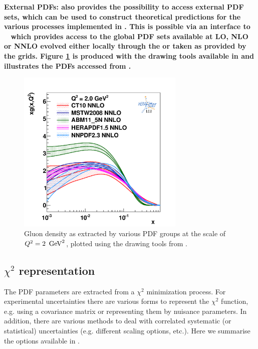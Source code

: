 \begin{description}
%
\item \bf{External PDFs:} \rm 
\fitter also provides the possibility to access external PDF sets, which can be used to construct 
theoretical predictions for the various processes implemented in \fitter. This is possible via an 
interface to \lhapdf~\cite{lhapdf,lhapdfweb} which provides access to the global PDF sets available at LO, NLO 
or NNLO evolved either locally through the \fitter or taken as provided by the \lhapdf grids. 
Figure \ref{fig:pdfs} is produced with the drawing tools available in \fitter and illustrates 
the PDFs accessed from \lhapdf.
\end{description}
%
\begin{figure}[!ht]
   \centering
   \includegraphics[width=8cm]{pdfs.pdf}
   \caption{Gluon density as extracted by various PDF groups at the scale of $Q^2=2 \ \,\text{Ge\hspace{-.08em}V}^2$, plotted using the drawing tools from \fitter.} 
 \label{fig:pdfs}
\end{figure}
%
\subsection{$\chi^2$ representation}
\label{sec:chi2representation}

The PDF parameters are extracted from a $\chi^2$ minimization process. 
For experimental uncertainties there are various forms to represent the $\chi^2$ function, e.g. using a covariance matrix or representing them by nuisance parameters. 
In addition, there are various methods to deal with correlated systematic (or statistical) uncertainties (e.g. different scaling options, etc.). Here we summarise the options available in \fitter. 

